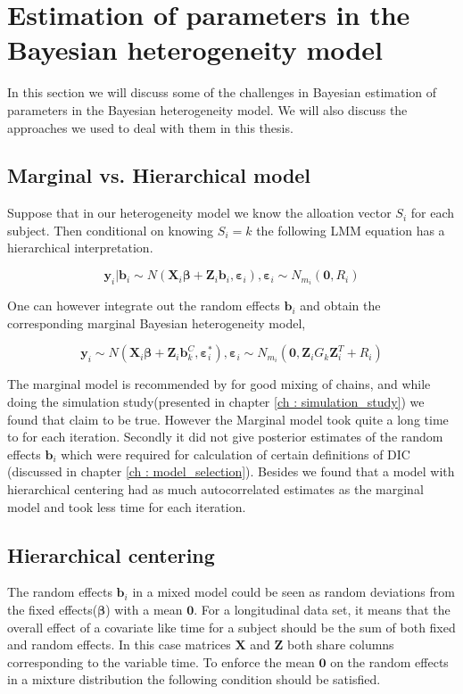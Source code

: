 \section{Estimation of parameters in the Bayesian heterogeneity model}
In this section we will discuss some of the challenges in Bayesian estimation of parameters in the Bayesian heterogeneity model. We will also discuss the approaches we used to deal with them in this thesis.

\subsection{Marginal vs. Hierarchical model}
Suppose that in our heterogeneity model we know the alloation vector $S_i$ for each subject. Then conditional on knowing $S_i=k$ the following LMM equation has a hierarchical interpretation.

$$\boldsymbol{y}_i|\boldsymbol{b}_{i} \sim N(\boldsymbol{X}_{i}\boldsymbol{\beta} + \boldsymbol{Z}_{i}\boldsymbol{b}_{i},\boldsymbol{\varepsilon}_{i}), 
\boldsymbol{\varepsilon}_{i} \sim N_{m_i}(\boldsymbol{0}, R_i)$$

One can however integrate out the random effects $\boldsymbol{b}_{i}$ and obtain the corresponding marginal Bayesian heterogeneity model,

$$\boldsymbol{y}_i \sim N(\boldsymbol{X}_{i}\boldsymbol{\beta} + \boldsymbol{Z}_{i}\boldsymbol{b}_k^C, \boldsymbol{\varepsilon}_{i}^*), 
\boldsymbol{\varepsilon}_{i} \sim N_{m_i}(\boldsymbol{0}, \boldsymbol{Z}_{i}G_k\boldsymbol{Z}_{i}^T+ R_i)$$

The marginal model is recommended by \citet{fruhwirth-schnatter_bayesian_2004} for good mixing of chains, and while doing the simulation study(presented in chapter \ref{ch : simulation_study}) we found that claim to be true. However the Marginal model took quite a long time to for each iteration. Secondly it did not give posterior estimates of the random effects $\boldsymbol{b}_i$ which were required for calculation of certain definitions of DIC (discussed in chapter \ref{ch : model_selection}). Besides we found that a model with hierarchical centering had as much autocorrelated estimates as the marginal model and took less time for each iteration.

\subsection{Hierarchical centering}
The random effects $\boldsymbol{b}_i$ in a mixed model could be seen as random deviations from the fixed effects($\boldsymbol{\beta}$) with a mean $\boldsymbol{0}$. For a longitudinal data set, it means that the overall effect of a covariate like time for a subject should be the sum of both fixed and random effects. In this case matrices $\boldsymbol{X}$ and $\boldsymbol{Z}$ both share columns corresponding to the variable time. To enforce the mean $\boldsymbol{0}$ on the random effects in a mixture distribution the following condition should be satisfied.

